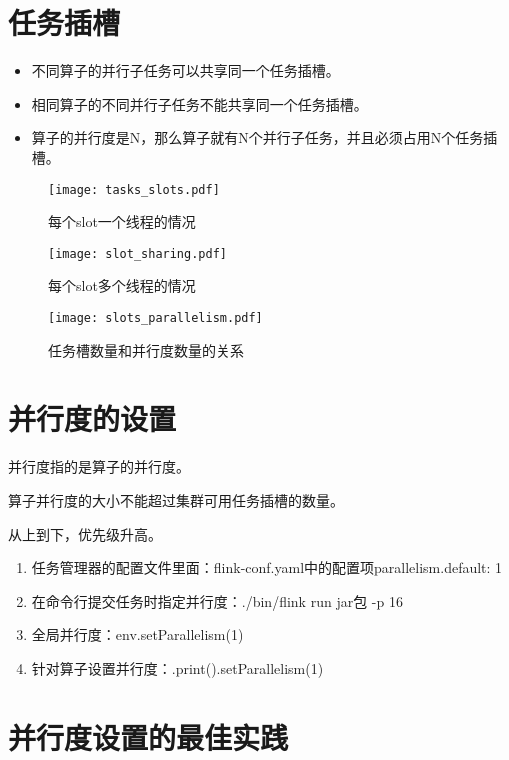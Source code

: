 \documentclass[cn,11pt,chinese]{elegantbook}
\begin{document}
\section{任务插槽}

\begin{itemize}
  \item 不同算子的并行子任务可以共享同一个任务插槽。
  \item 相同算子的不同并行子任务不能共享同一个任务插槽。
  \item 算子的并行度是N，那么算子就有N个并行子任务，并且必须占用N个任务插槽。
\end{itemize}

\begin{figure}[htbp]
	\centering
	\texttt{[image: tasks\_slots.pdf]}
  \caption{每个slot一个线程的情况}
\end{figure}

\begin{figure}[htbp]
	\centering
	\texttt{[image: slot\_sharing.pdf]}
  \caption{每个slot多个线程的情况}
\end{figure}

\begin{figure}[htbp]
  \centering
  \texttt{[image: slots\_parallelism.pdf]}
  \caption{任务槽数量和并行度数量的关系}
\end{figure}

\section{并行度的设置}

并行度指的是算子的并行度。

算子并行度的大小不能超过集群可用任务插槽的数量。

从上到下，优先级升高。

\begin{enumerate}
  \item 任务管理器的配置文件里面：flink-conf.yaml中的配置项parallelism.default: 1
  \item 在命令行提交任务时指定并行度：./bin/flink run jar包 -p 16
  \item 全局并行度：env.setParallelism(1)
  \item 针对算子设置并行度：.print().setParallelism(1)
\end{enumerate}

\section{并行度设置的最佳实践}
\end{document}
